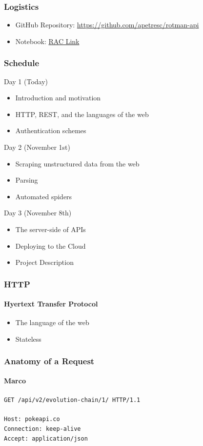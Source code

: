 \documentclass{beamer}
\begin{document}
\begin{frame}
  \frametitle{Logistics}
  
  \begin{itemize}
    \item GitHub Repository: \href{https://github.com/apetresc/rotman-api}{https://github.com/apetresc/rotman-api}
    \item Notebook: \href{https://rac.rotman.utoronto.ca/jupyter/user/ut_apetrescu/lab/tree/Day1.ipynb}{RAC Link}
  \end{itemize}
\end{frame}


\begin{frame}
  \frametitle{Schedule}
  
  \alert{Day 1 (Today)}
  \begin{itemize}
    \item Introduction and motivation
    \item HTTP, REST, and the languages of the web
    \item Authentication schemes
  \end{itemize}

  Day 2 (November 1st)
  \begin{itemize}
    \item Scraping unstructured data from the web
    \item Parsing 
    \item Automated spiders
  \end{itemize}

  Day 3 (November 8th)
  \begin{itemize}
    \item The server-side of APIs
    \item Deploying to the Cloud
    \item Project Description
  \end{itemize}
\end{frame}


\begin{frame}
  \frametitle{HTTP}
  \framesubtitle{Hyertext Transfer Protocol}
  \begin{itemize}
    \item The language of the web
    \item Stateless
  \end{itemize}
\end{frame}


\begin{frame}
  \frametitle{Anatomy of a Request}
  \framesubtitle{Marco}
  \texttt{{\color{red}GET} {\color{darkgreen}/api/v2/evolution-chain/1/} {\color{blue}HTTP/1.1}}
  \pause
  \\
  \bigskip
  \\
  {
    \color{olive}
    \texttt{Host: pokeapi.co} \\
    \texttt{Connection: keep-alive} \\
    \texttt{Accept: application/json}
  }
\end{frame}
\end{document}
